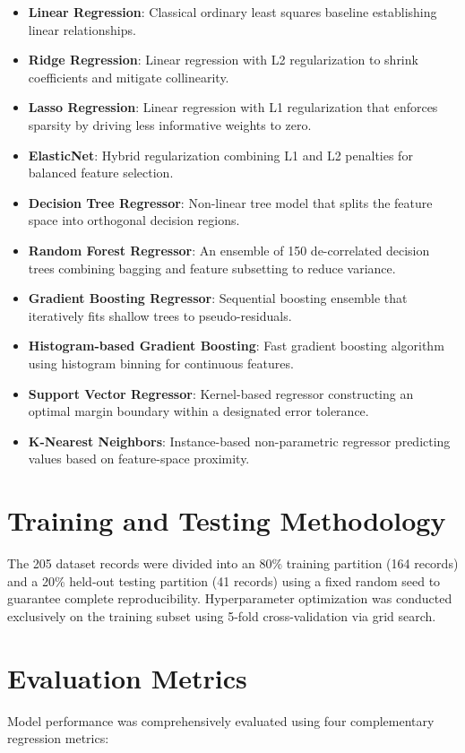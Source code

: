 \documentclass[conference]{IEEEtran}
\begin{document}
\begin{itemize}
    \item \textbf{Linear Regression}: Classical ordinary least squares baseline establishing linear relationships.
    \item \textbf{Ridge Regression}: Linear regression with L2 regularization to shrink coefficients and mitigate collinearity.
    \item \textbf{Lasso Regression}: Linear regression with L1 regularization that enforces sparsity by driving less informative weights to zero.
    \item \textbf{ElasticNet}: Hybrid regularization combining L1 and L2 penalties for balanced feature selection.
    \item \textbf{Decision Tree Regressor}: Non-linear tree model that splits the feature space into orthogonal decision regions.
    \item \textbf{Random Forest Regressor}: An ensemble of 150 de-correlated decision trees combining bagging and feature subsetting to reduce variance.
    \item \textbf{Gradient Boosting Regressor}: Sequential boosting ensemble that iteratively fits shallow trees to pseudo-residuals.
    \item \textbf{Histogram-based Gradient Boosting}: Fast gradient boosting algorithm using histogram binning for continuous features.
    \item \textbf{Support Vector Regressor}: Kernel-based regressor constructing an optimal margin boundary within a designated error tolerance.
    \item \textbf{K-Nearest Neighbors}: Instance-based non-parametric regressor predicting values based on feature-space proximity.
\end{itemize}

\section{Training and Testing Methodology}
The 205 dataset records were divided into an 80\% training partition (164 records) and a 20\% held-out testing partition (41 records) using a fixed random seed to guarantee complete reproducibility. Hyperparameter optimization was conducted exclusively on the training subset using 5-fold cross-validation via grid search.

\section{Evaluation Metrics}
Model performance was comprehensively evaluated using four complementary regression metrics:
\end{document}

